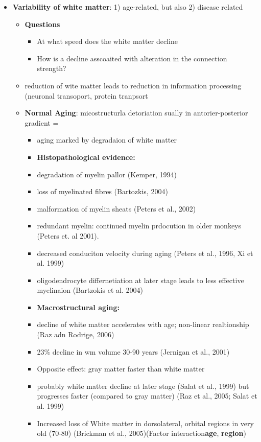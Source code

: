 \documentclass[fleqn]{article}\usepackage{caption}
\begin{document}
\begin{itemize}
\item \textbf{Variability of white matter}: 1) age-related, but also 2) disease related
\begin{itemize}
\item \textbf{Questions}
\begin{itemize}
\item At what speed does the white matter decline
\item How is a decline asscoaited with alteration in the connection strength?
\end{itemize}
\item reduction of wite matter leads to reduction in information processing (neuronal transoport, protein tranpsort
\item  \textbf{Normal Aging}: micostructurla detoriation sually in antorier-posterior gradient =
\begin{itemize}
\item aging marked by degradaion of white matter
\item \textbf{Histopathological evidence:}
\item degradation of myelin pallor (Kemper, 1994)
\item loss of myelinated fibres (Bartozkis, 2004)
\item malformation of myelin sheats (Peters et al., 2002)
\item redundant myelin: continued myelin prdocution in older monkeys (Peters et. al 2001). 
\item decreased conduciton velocity during aging (Peters et al., 1996, Xi et al. 1999)
\item oligodendrocyte differnetiation at later stage leads to less effective myelinaion  (Bartzokis et al. 2004)
\item \textbf{Macrostructural aging:}
\item decline of white matter accelerates with age; non-linear realtionship (Raz adn Rodrige, 2006)
\item 23\% decline in wm volume 30-90 years (Jernigan et al., 2001) 
\item Opposite effect: gray matter faster than white matter
\item probably white matter decline at later stage (Salat et al., 1999) but progresses faster (compared to gray matter) (Raz et al., 2005; Salat et al. 1999)
\item Increased loss of White matter in dorsolateral, orbital regions in very old (70-80) (Brickman et al., 2005)(Factor interaction\textbf{age}, \textbf{region})

\end{itemize}
\end{itemize}
\end{itemize}
\end{document}
